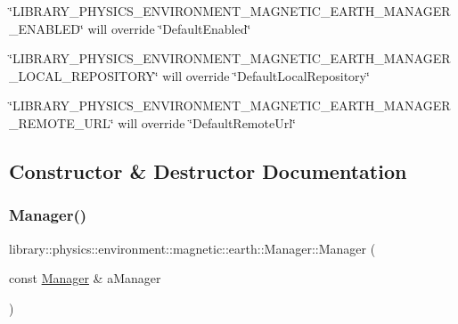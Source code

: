 \begin{DoxyItemize}
\item \char`\"{}\+L\+I\+B\+R\+A\+R\+Y\+\_\+\+P\+H\+Y\+S\+I\+C\+S\+\_\+\+E\+N\+V\+I\+R\+O\+N\+M\+E\+N\+T\+\_\+\+M\+A\+G\+N\+E\+T\+I\+C\+\_\+\+E\+A\+R\+T\+H\+\_\+\+M\+A\+N\+A\+G\+E\+R\+\_\+\+E\+N\+A\+B\+L\+E\+D\char`\"{} will override \char`\"{}\+Default\+Enabled\char`\"{}
\item \char`\"{}\+L\+I\+B\+R\+A\+R\+Y\+\_\+\+P\+H\+Y\+S\+I\+C\+S\+\_\+\+E\+N\+V\+I\+R\+O\+N\+M\+E\+N\+T\+\_\+\+M\+A\+G\+N\+E\+T\+I\+C\+\_\+\+E\+A\+R\+T\+H\+\_\+\+M\+A\+N\+A\+G\+E\+R\+\_\+\+L\+O\+C\+A\+L\+\_\+\+R\+E\+P\+O\+S\+I\+T\+O\+R\+Y\char`\"{} will override \char`\"{}\+Default\+Local\+Repository\char`\"{}
\item \char`\"{}\+L\+I\+B\+R\+A\+R\+Y\+\_\+\+P\+H\+Y\+S\+I\+C\+S\+\_\+\+E\+N\+V\+I\+R\+O\+N\+M\+E\+N\+T\+\_\+\+M\+A\+G\+N\+E\+T\+I\+C\+\_\+\+E\+A\+R\+T\+H\+\_\+\+M\+A\+N\+A\+G\+E\+R\+\_\+\+R\+E\+M\+O\+T\+E\+\_\+\+U\+R\+L\char`\"{} will override \char`\"{}\+Default\+Remote\+Url\char`\"{} 
\end{DoxyItemize}

\subsection{Constructor \& Destructor Documentation}
\mbox{\label{classlibrary_1_1physics_1_1environment_1_1magnetic_1_1earth_1_1_manager_a8487bb588deb7bb2c9b3fa1a5a59b422}} 
\subsubsection{\texorpdfstring{Manager()}{Manager()}}
{\footnotesize\ttfamily library\+::physics\+::environment\+::magnetic\+::earth\+::\+Manager\+::\+Manager (\begin{DoxyParamCaption}\item[{const \hyperlink{classlibrary_1_1physics_1_1environment_1_1magnetic_1_1earth_1_1_manager}{Manager} \&}]{a\+Manager }\end{DoxyParamCaption})\hspace{0.3cm}{\ttfamily [delete]}}



